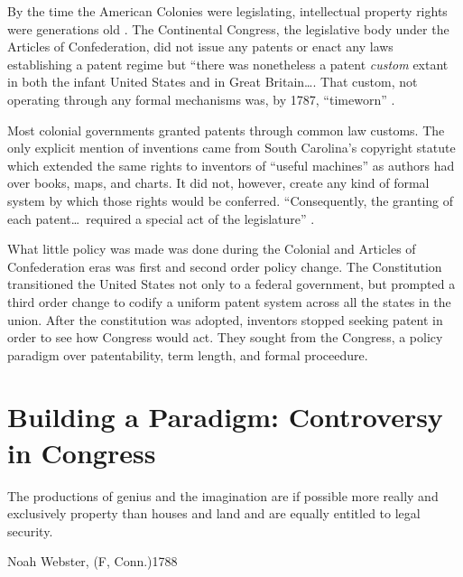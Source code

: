 \documentclass[pdftex,11pt,letterpaper]{article}
\begin{document}
By the time the American Colonies were legislating, intellectual property rights were generations old \autocite{Prager1944}. The Continental Congress, the legislative body under the Articles of Confederation, did not issue any patents or enact any laws establishing a patent regime but ``there was nonetheless a patent \emph{custom} extant in both the infant United States and in Great Britain\ldots. That custom, not operating through any formal mechanisms was, by 1787, ``timeworn'' \autocite[emphasis added]{Walterscheid1997}. 

Most colonial governments granted patents through common law customs. The only explicit mention of inventions came from South Carolina's copyright statute which extended the same rights to inventors of ``useful machines'' as authors had over books, maps, and charts. It did not, however, create any kind of formal system by which those rights would be conferred. ``Consequently, the granting of each patent\ldots~required a special act of the legislature'' \autocite{Walterscheid1997, Prager1944}. 

What little policy was made was done during the Colonial and Articles of Confederation eras was first and second order policy change. The Constitution transitioned the United States not only to a federal government, but prompted a third order change to codify a uniform patent system across all the states in the union. After the constitution was adopted, inventors stopped seeking patent in order to see how Congress would act. They sought from the Congress, a policy paradigm over patentability, term length, and formal proceedure.


\section{Building a Paradigm: Controversy in Congress}
\epigraph{The productions of genius and the imagination are if possible more really and exclusively property than houses and land and are equally entitled to legal security.}{Noah Webster, (F, Conn.)1788}
\end{document}
